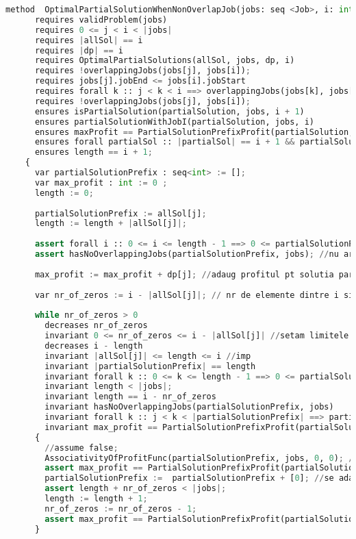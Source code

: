 \begin{lstlisting}[language = Python]
    method  OptimalPartialSolutionWhenNonOverlapJob(jobs: seq <Job>, i: int, dp: seq<int>, allSol :seq<seq<int>>, j : int) returns (maxProfit:int, partialSolution: seq<int>, length: int)
      requires validProblem(jobs)
      requires 0 <= j < i < |jobs|
      requires |allSol| == i
      requires |dp| == i
      requires OptimalPartialSolutions(allSol, jobs, dp, i)
      requires !overlappingJobs(jobs[j], jobs[i]);
      requires jobs[j].jobEnd <= jobs[i].jobStart
      requires forall k :: j < k < i ==> overlappingJobs(jobs[k], jobs[i]) //job-urile de pe pozitiile j+1..i-1 se suprapun cu i
      requires !overlappingJobs(jobs[j], jobs[i]);
      ensures isPartialSolution(partialSolution, jobs, i + 1)
      ensures partialSolutionWithJobI(partialSolution, jobs, i)
      ensures maxProfit == PartialSolutionPrefixProfit(partialSolution, jobs, 0)
      ensures forall partialSol :: |partialSol| == i + 1 && partialSolutionWithJobI(partialSol, jobs, i) ==> HasLessProfit(partialSol, jobs, maxProfit, 0)
      ensures length == i + 1;
    {
      var partialSolutionPrefix : seq<int> := [];
      var max_profit : int := 0 ;
      length := 0;
      
      partialSolutionPrefix := allSol[j];
      length := length + |allSol[j]|;
      
      assert forall i :: 0 <= i <= length - 1 ==> 0 <= partialSolutionPrefix[i] <= 1; //toate elementele sunt 0 sau 1
      assert hasNoOverlappingJobs(partialSolutionPrefix, jobs); //nu are job-uri care se suprapun pentru ca allSol[j] este solutie partiala optima
      
      max_profit := max_profit + dp[j]; //adaug profitul pt solutia partiala optima (cu job-uri pana la pozitia j)
      
      var nr_of_zeros := i - |allSol[j]|; // nr de elemente dintre i si j
    
      while nr_of_zeros > 0
        decreases nr_of_zeros
        invariant 0 <= nr_of_zeros <= i - |allSol[j]| //setam limitele pentru nr_of_zeros
        decreases i - length
        invariant |allSol[j]| <= length <= i //imp
        invariant |partialSolutionPrefix| == length
        invariant forall k :: 0 <= k <= length - 1 ==> 0 <= partialSolutionPrefix[k] <= 1
        invariant length < |jobs|;
        invariant length == i - nr_of_zeros
        invariant hasNoOverlappingJobs(partialSolutionPrefix, jobs)
        invariant forall k :: j < k < |partialSolutionPrefix| ==> partialSolutionPrefix[k] == 0
        invariant max_profit == PartialSolutionPrefixProfit(partialSolutionPrefix, jobs, 0)
      {
        //assume false;
        AssociativityOfProfitFunc(partialSolutionPrefix, jobs, 0, 0); //demonstram ca daca adaugam 0 profitul "ramane acelasi" 0 * jobs[..]
        assert max_profit == PartialSolutionPrefixProfit(partialSolutionPrefix, jobs, 0);
        partialSolutionPrefix :=  partialSolutionPrefix + [0]; //se adauga de nr_of_zeros ori
        assert length + nr_of_zeros < |jobs|;
        length := length + 1;
        nr_of_zeros := nr_of_zeros - 1;
        assert max_profit == PartialSolutionPrefixProfit(partialSolutionPrefix, jobs, 0);
      }
    

\end{lstlisting}
